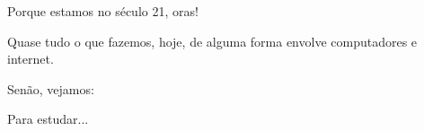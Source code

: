 Porque estamos no século 21, oras!

Quase tudo o que fazemos, hoje, de alguma forma envolve computadores e internet.

Senão, vejamos:

Para estudar...
\vfill\null
\pagebreak


